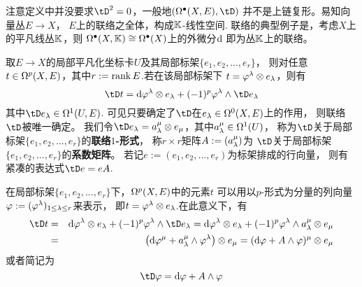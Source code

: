 
注意定义中并没要求$\tD^2=0$，一般地$(\Omg\updot(X,E),\tD)$
并不是上链复形。易知向量丛$E\to X$，
$E$上的联络之全体，构成$\mathbb{K}$-线性空间.
联络的典型例子是，考虑$X$上的平凡线丛$\mathbb{K}$，则
$\Omega^{\bullet}(X,\mathbb{K})\cong\Omega^{\bullet}(X)$上的外微分$\mathrm{d}$
即为丛$\mathbb{K}$上的联络。\vs 

取$E\to X$的局部平凡化坐标卡$U$及其局部标架$\{e_1,e_2,...,e_r\}$，
则对任意$t\in\Omega^p(X,E)$，其中$r:=\operatorname{rank} E$.若在该局部标架下
$t=\varphi^\lambda\otimes e_\lambda$，则有
$$
  \tD t=
    \td\fai^\lmd\ten e_\lmd
   +(-1)^p\fai^\lmd\wedge\tD e_\lmd
$$
其中$\tD e_\lmd\in\Omg^1(U,E)$.
可见只要确定了$\tD$在$e_\lambda\in\Omega^0(X,E)$上的作用，
则联络$\tD$被唯一确定。
我们令$\tD e_\lmd=a_\lmd^\mu\ten e_\mu$，其中$a_\lambda^\mu\in\Omega^1(U)$，
称为$\tD$关于局部标架$\{e_1,e_2,...,e_r\}$的\textbf{联络$1$-形式}，
称$r\times r$矩阵$A:=(a^\mu_\lambda)$为
$\tD$关于局部标架$\{e_1,e_2,...,e_r\}$的\textbf{系数矩阵}。
若记$e:=(e_1,e_2,...,e_r)$为标架排成的行向量，
则有紧凑的表达式$\tD e=eA$.

在局部标架$\{e_1,e_2,...,e_r\}$下，$\Omega^p(X,E)$中的元素$t$
可以用以$p$-形式为分量的列向量$\varphi:=(\varphi^\lambda)_{1\leq\lambda\leq r}$来表示，
即$t=\varphi^\lambda\otimes e_\lambda$.在此意义下，有
\begin{eqnarray*}
     \tD t
&=&
     \td\fai^\lmd\ten e_\lmd
    +(-1)^p\fai^\lmd\wedge\tD e_\lmd
 =
     \td\fai^\lmd\ten e_\lmd
    +(-1)^p\fai^\lmd\wedge a_\lmd^\mu\ten e_\mu\\
&=&
     \left(
       \td\fai^\mu+a_\lmd^\mu\wedge\fai^\lmd
     \right)\ten e_\mu
 =
     (\td\fai+A\wedge\fai)^\mu\ten e_\mu
\end{eqnarray*}
或者简记为
$$\tD\fai=\td\fai+A\wedge\fai$$


